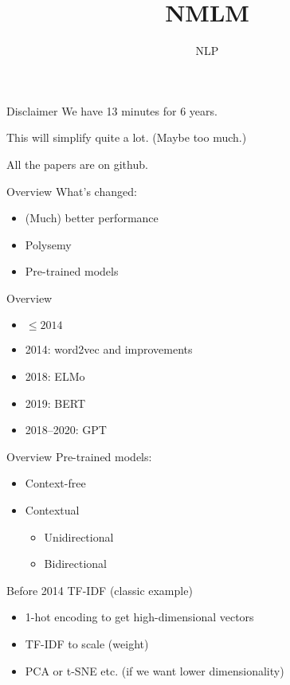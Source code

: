 \documentclass[t,aspectratio=169]{beamer}
\title
{NMLM}
\subtitle{NLP}
\begin{document}
\begin{frame}
  \titlepage
\end{frame}

\begin{frame}{Disclaimer}
  We have 13 minutes for 6 years.

  This will simplify quite a lot.  (Maybe too much.)

  All the papers are on github.
\end{frame}

\begin{frame}{Overview}
  What's changed:
  \begin{itemize}
  \item (Much) better performance
  \item Polysemy
  \item Pre-trained models
  \end{itemize}
\end{frame}

\begin{frame}{Overview}
  \begin{itemize}
  \item $\le 2014$
  \item 2014: word2vec and improvements
  \item 2018: ELMo
  \item 2019: BERT
  \item 2018--2020: GPT
  \end{itemize}
\end{frame}

\begin{frame}{Overview}
  Pre-trained models:
  \begin{itemize}
  \item Context-free 
  \item Contextual
    \begin{itemize}
    \item Unidirectional 
    \item Bidirectional 
    \end{itemize}

  \end{itemize}
\end{frame}

\begin{frame}{Before 2014}
  TF-IDF (classic example)

  \begin{itemize}
  \item 1-hot encoding to get high-dimensional vectors
  \item TF-IDF to scale (weight)
  \item PCA or t-SNE etc. (if we want lower dimensionality)
  \end{itemize}

\end{frame}
\end{document}
